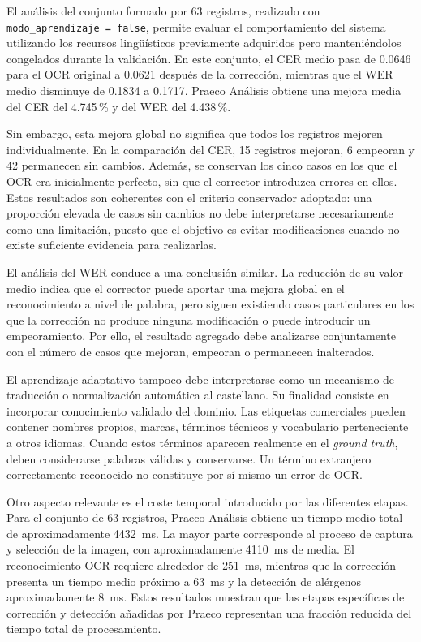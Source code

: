 El análisis del conjunto formado por 63 registros, realizado con \texttt{modo\_aprendizaje = false}, permite evaluar el comportamiento del sistema utilizando los recursos lingüísticos previamente adquiridos pero manteniéndolos congelados durante la validación. En este conjunto, el CER medio pasa de 0.0646 para el OCR original a 0.0621 después de la corrección, mientras que el WER medio disminuye de 0.1834 a 0.1717. Praeco Análisis obtiene una mejora media del CER del 4.745\,\% y del WER del 4.438\,\%.

Sin embargo, esta mejora global no significa que todos los registros mejoren individualmente. En la comparación del CER, 15 registros mejoran, 6 empeoran y 42 permanecen sin cambios. Además, se conservan los cinco casos en los que el OCR era inicialmente perfecto, sin que el corrector introduzca errores en ellos. Estos resultados son coherentes con el criterio conservador adoptado: una proporción elevada de casos sin cambios no debe interpretarse necesariamente como una limitación, puesto que el objetivo es evitar modificaciones cuando no existe suficiente evidencia para realizarlas.

El análisis del WER conduce a una conclusión similar. La reducción de su valor medio indica que el corrector puede aportar una mejora global en el reconocimiento a nivel de palabra, pero siguen existiendo casos particulares en los que la corrección no produce ninguna modificación o puede introducir un empeoramiento. Por ello, el resultado agregado debe analizarse conjuntamente con el número de casos que mejoran, empeoran o permanecen inalterados.

El aprendizaje adaptativo tampoco debe interpretarse como un mecanismo de traducción o normalización automática al castellano. Su finalidad consiste en incorporar conocimiento validado del dominio. Las etiquetas comerciales pueden contener nombres propios, marcas, términos técnicos y vocabulario perteneciente a otros idiomas. Cuando estos términos aparecen realmente en el \textit{ground truth}, deben considerarse palabras válidas y conservarse. Un término extranjero correctamente reconocido no constituye por sí mismo un error de OCR.

Otro aspecto relevante es el coste temporal introducido por las diferentes etapas. Para el conjunto de 63 registros, Praeco Análisis obtiene un tiempo medio total de aproximadamente 4432~ms. La mayor parte corresponde al proceso de captura y selección de la imagen, con aproximadamente 4110~ms de media. El reconocimiento OCR requiere alrededor de 251~ms, mientras que la corrección presenta un tiempo medio próximo a 63~ms y la detección de alérgenos aproximadamente 8~ms. Estos resultados muestran que las etapas específicas de corrección y detección añadidas por Praeco representan una fracción reducida del tiempo total de procesamiento.

